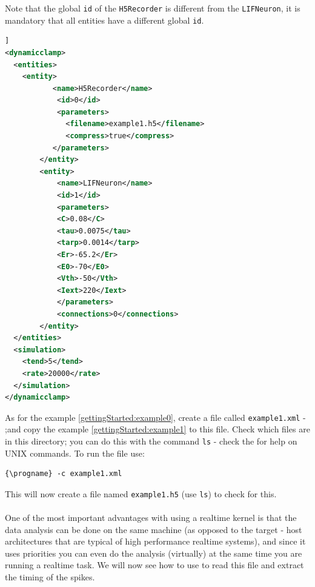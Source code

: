 Note that the global \texttt{id} of the \texttt{H5Recorder} is
different from the \texttt{LIFNeuron}, it is mandatory that all
entities have a different global \texttt{id}.

\begin{lstlisting}[caption={Example of a configuration file with a the H5Recorder entity.},label={gettingStarted:example1},language=XML,morekeywords={dynamic clamp,entities,entity,name,id,filename,compress,C,tau,tarp,Er,E0,Vth,Iext,parameters,connections,simulation,tend,rate}]]
<dynamicclamp>
  <entities>
  	<entity>
 	       <name>H5Recorder</name>
        	<id>0</id>
        	<parameters>
		      <filename>example1.h5</filename>
		      <compress>true</compress>
	       </parameters>
    	</entity>
    	<entity>
      		<name>LIFNeuron</name>
      		<id>1</id>
      		<parameters>
			<C>0.08</C>
			<tau>0.0075</tau>
			<tarp>0.0014</tarp>
			<Er>-65.2</Er>
			<E0>-70</E0>
			<Vth>-50</Vth>
			<Iext>220</Iext>
      		</parameters>
      		<connections>0</connections>
    	</entity>
  </entities>
  <simulation>
  	<tend>5</tend>
   	<rate>20000</rate>
  </simulation>
</dynamicclamp>

\end{lstlisting}

As for the example \ref{gettingStarted:example0}, create a file called
\texttt{example1.xml}  - ;and copy the
example \ref{gettingStarted:example1} to this file. Check which files
are in this directory; you can do this with the command \texttt{ls} -
check the  for help on UNIX
commands. To run the file use:
\begin{lstlisting}[escapeinside=\{\}]
{\progname} -c example1.xml
\end{lstlisting}

This will now create a file named \texttt{example1.h5} (use \texttt{ls}) to check for this.

\paragraph{} One of the most important advantages with using a
realtime kernel is that the data analysis can be done on the same
machine (as opposed to the target - host architectures that are
typical of high performance realtime systems), and since it uses
priorities you can even do the analysis (virtually) at the same time
you are running a realtime task. We will now see how to use
\textbf{\matlab} to read this file and extract the timing of the
spikes. 

